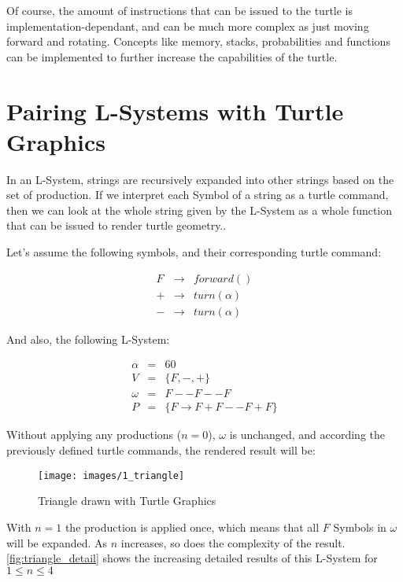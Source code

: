 \documentclass{acmtog}
\begin{document}
Of course, the amount of instructions that can be issued to the turtle is implementation-dependant, and can be much more complex as just moving forward and rotating. Concepts like memory, stacks, probabilities and functions can be implemented to further increase the capabilities of the turtle.

\section{Pairing L-Systems with Turtle Graphics}
\label{sec:pairing}

In an L-System, strings are recursively expanded into other strings based on the set of production. If we interpret each Symbol of a string as a turtle command, then we can look at the whole string given by the L-System as a whole function that can be issued to render turtle geometry..

Let's assume the following symbols, and their corresponding turtle command:

\begin{eqnarray*}
    F & \rightarrow &  forward()  \\
    + & \rightarrow &  turn(\alpha)   \\
    - & \rightarrow &  turn(\alpha)  
\end{eqnarray*}

And also, the following L-System:

\begin{eqnarray*}
  \alpha  &=& 60                         \\
  V       &=& \{F, -, +\}                \\
  \omega  &=& F--F--F                     \\
  P       &=& \{F \rightarrow F+F--F+F \}    
\end{eqnarray*}

Without applying any productions ($n=0$), $\omega$ is unchanged, and according the previously defined turtle commands, the rendered result will be:

\begin{figure}[!htp]
  \begin{center}
    \texttt{[image: images/1\_triangle]}
    \caption{Triangle drawn with Turtle Graphics \label{fig:triangle}}
    \end{center}
\end{figure}

With $n=1$ the production is applied once, which means that all $F$ Symbols in $\omega$ will be expanded. As $n$ increases, so does the complexity of the result. \autoref{fig:triangle_detail} shows the increasing detailed results of this L-System for $1 \leq n \leq 4$
\end{document}
